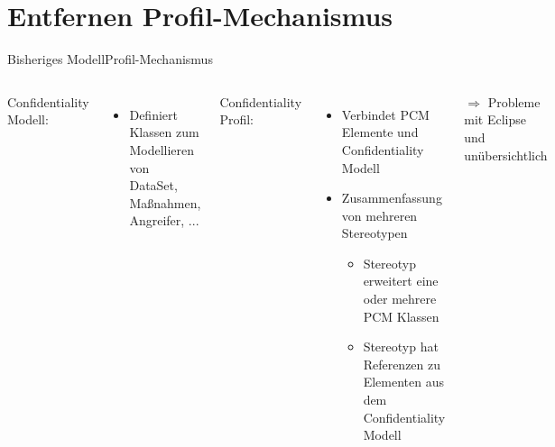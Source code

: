 \documentclass{sdqbeamer}
\begin{document}
\section{Entfernen Profil-Mechanismus}
\begin{frame}{Bisheriges Modell}{Profil-Mechanismus}
\begin{columns}
Confidentiality Modell: 
\begin{itemize}
	\item Definiert Klassen zum Modellieren von DataSet, Maßnahmen, Angreifer, ...
\end{itemize}
\vspace{0.05\textheight}
Confidentiality Profil:
\begin{itemize}
	\item Verbindet PCM Elemente und Confidentiality Modell
	\item Zusammenfassung von mehreren Stereotypen
	\begin{itemize}
		\item Stereotyp erweitert eine oder mehrere PCM Klassen
		\item Stereotyp hat Referenzen zu Elementen aus dem Confidentiality Modell
	\end{itemize}
	
\end{itemize}%
$\Rightarrow$ Probleme mit Eclipse und unübersichtlich
\centering
{}
\end{columns}
\end{frame}	
\end{document}
